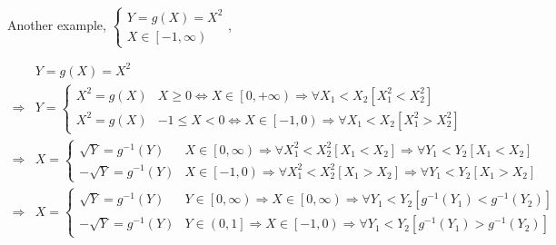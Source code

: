 \documentclass[
]{book}
\theoremstyle{definition}
\theoremstyle{definition}
\theoremstyle{definition}
\theoremstyle{definition}
\theoremstyle{remark}
\begin{document}
\[
\tag*{$\Box$}
\]

Another example, \(\begin{cases} Y=g\left(X\right)=X^{2}\\ X\in\left[-1,\infty\right) \end{cases}\),

\[
\begin{aligned}
 & Y=g\left(X\right)=X^{2}\\
\Rightarrow & Y=\begin{cases}
X^{2}=g\left(X\right) & X\ge0\Leftrightarrow X\in\left[0,+\infty\right)\Rightarrow\forall X_{{\scriptscriptstyle 1}}<X_{{\scriptscriptstyle 2}}\left[X_{{\scriptscriptstyle 1}}^{2}<X_{{\scriptscriptstyle 2}}^{2}\right]\\
X^{2}=g\left(X\right) & -1\le X<0\Leftrightarrow X\in\left[-1,0\right)\Rightarrow\forall X_{{\scriptscriptstyle 1}}<X_{{\scriptscriptstyle 2}}\left[X_{{\scriptscriptstyle 1}}^{2}>X_{{\scriptscriptstyle 2}}^{2}\right]
\end{cases}\\
\Rightarrow & X=\begin{cases}
\sqrt{Y}=g^{-1}\left(Y\right) & X\in\left[0,\infty\right)\Rightarrow\forall X_{{\scriptscriptstyle 1}}^{2}<X_{{\scriptscriptstyle 2}}^{2}\left[X_{{\scriptscriptstyle 1}}<X_{{\scriptscriptstyle 2}}\right]\Rightarrow\forall Y_{{\scriptscriptstyle 1}}<Y_{{\scriptscriptstyle 2}}\left[X_{{\scriptscriptstyle 1}}<X_{{\scriptscriptstyle 2}}\right]\\
-\sqrt{Y}=g^{-1}\left(Y\right) & X\in\left[-1,0\right)\Rightarrow\forall X_{{\scriptscriptstyle 1}}^{2}<X_{{\scriptscriptstyle 2}}^{2}\left[X_{{\scriptscriptstyle 1}}>X_{{\scriptscriptstyle 2}}\right]\Rightarrow\forall Y_{{\scriptscriptstyle 1}}<Y_{{\scriptscriptstyle 2}}\left[X_{{\scriptscriptstyle 1}}>X_{{\scriptscriptstyle 2}}\right]
\end{cases}\\
\Rightarrow & X=\begin{cases}
\sqrt{Y}=g^{-1}\left(Y\right) & Y\in\left[0,\infty\right)\Rightarrow X\in\left[0,\infty\right)\Rightarrow\forall Y_{{\scriptscriptstyle 1}}<Y_{{\scriptscriptstyle 2}}\left[g^{-1}\left(Y_{{\scriptscriptstyle 1}}\right)<g^{-1}\left(Y_{{\scriptscriptstyle 2}}\right)\right]\\
-\sqrt{Y}=g^{-1}\left(Y\right) & Y\in\left(0,1\right]\Rightarrow X\in\left[-1,0\right)\Rightarrow\forall Y_{{\scriptscriptstyle 1}}<Y_{{\scriptscriptstyle 2}}\left[g^{-1}\left(Y_{{\scriptscriptstyle 1}}\right)>g^{-1}\left(Y_{{\scriptscriptstyle 2}}\right)\right]

\end{cases}
\end{aligned}\]
\end{document}
